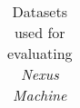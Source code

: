 \begin{table}[h!]
{\begin{tabular}{rrrr}
    \end{tabular}
  }
    \caption{Datasets used for evaluating \textit{Nexus Machine}}
    \label{table:datasets}
\end{table}
\begin{comment}
\textit{Nexus Machine} is designed for accelerating irregular workloads including sparse tensor algebra and graph analytics, specifically for performing computations on sparse tensors.
We evaluated \textit{Nexus Machine} on six workloads, as illustrated in Table~\ref{table:datasets}.

\textbf{Sparse Matrix-Vector Multiplication (SpMv)} multiplies a Sparse Matrix in CSR format with a Dense Vector. 
\textbf{Sparse Matrix Multiplication (SpMSpM)} multiplies two Sparse matrices, both in CSR format. Our baselines are based on Gustavson's algorithm (Row-based) as it is an asymptotically efficient parallel algorithm that processes one output row at a time. It is an important linear algebra benchmark and manifests in many applications at the edge, including Pruned CNNs and Sparse Attention~\cite{sanger, vitcod}.
\textbf{Sparse Matrix Addition (M+M)} involves summing two matrices in CSR format element-wise. 
It is an important benchmark as CNNs accumulate intermediate feature maps across the output channels to get the final output activation.
\textbf{Sampled Dense-Dense Matrix Multiplication (SDDMM)} is a crucial kernel used in Sparse Attention and Graph Neural Networks. It computes the product of two dense matrices by evaluating them only at the non-zero entries of a sparse matrix in CSR format, which serves as the tensor for AM generation.

In graph analytics, \textbf{Breadth-First Search (BFS)} is a fundamental graph traversal algorithm to determine the vertices at a specific distance from the source node.
\textbf{Single shortest path (SSSP)} is the problem of finding a path between two vertices in a graph such that the sum of the weights of its constituent edges is minimized.
For our experiments, we represent graphs using adjacency matrices.
\end{comment}
